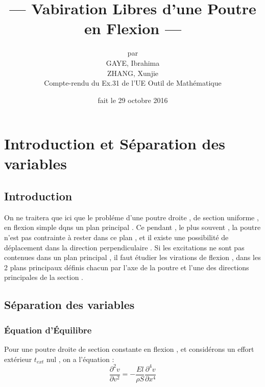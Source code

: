 \documentclass[a4paper,10pt]{report} %
\title{--- Vabiration Libres d'une Poutre en Flexion ---} %
\author{par\\GAYE, Ibrahima\\ ZHANG, Xunjie\\ Compte-rendu du Ex.31 de l'UE Outil de Mathématique } %
\date{fait le 29 octobre 2016} %
\begin{document}
\maketitle %
\tableofcontents %
\listoffigures %













\chapter{Introduction et Séparation des variables}

\section{Introduction}

On ne traitera que ici que le probléme d'une poutre droite , de section uniforme , en flexion simple dqns un plan principal .
Ce pendant , le plus souvent , la poutre n'est pas contrainte à rester dans ce plan , et il existe une possibilité de déplacement dans la direction perpendiculaire . Si les excitations ne sont pas contenues dans un plan principal , il faut étudier les virations de flexion , dans les 2 plans principaux définis chacun par l'axe de la poutre et l'une des directions principales de la section .


\section{Séparation des variables}

\subsection{Équation d'Équilibre}

Pour une poutre droite de section constante en flexion , et considérons un effort extérieur $t_{ext}$ nul , on a l'équation :
\begin{equation}
    \frac{\partial^2v}{\partial{v}^2}=-\frac{El}{\rho S}\frac{\partial^4{v}}{\partial{x}^4}
	\label{equantion1}
\end{equation}
\end{document}
